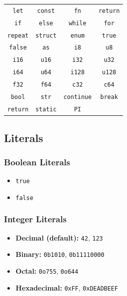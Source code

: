 \begin{table}[H]
    \centering
    \begin{tabular}{cccc}
        \toprule
        \texttt{let} & \texttt{const} & \texttt{fn} & \texttt{return} \\
        \texttt{if} & \texttt{else} & \texttt{while} & \texttt{for} \\
        \texttt{repeat} & \texttt{struct} & \texttt{enum} & \texttt{true} \\
        \texttt{false} & \texttt{as} & \texttt{i8} & \texttt{u8} \\
        \texttt{i16} & \texttt{u16} & \texttt{i32} & \texttt{u32} \\
        \texttt{i64} & \texttt{u64} & \texttt{i128} & \texttt{u128} \\
        \texttt{f32} & \texttt{f64} & \texttt{c32} & \texttt{c64} \\
        \texttt{bool} & \texttt{str} & \texttt{continue} & \texttt{break} \\
        \texttt{return} & \texttt{static} & \texttt{PI} \\
        \bottomrule
    \end{tabular}
\end{table}

\subsection{Literals}
\subsubsection{Boolean Literals}
\begin{itemize}
    \item \texttt{true}
    \item \texttt{false}
\end{itemize}

\subsubsection{Integer Literals}
\begin{itemize}
    \item \textbf{Decimal (default):} \texttt{42}, \texttt{123}
    \item \textbf{Binary:} \texttt{0b1010}, \texttt{0b11110000}
    \item \textbf{Octal:} \texttt{0o755}, \texttt{0o644}
    \item \textbf{Hexadecimal:} \texttt{0xFF}, \texttt{0xDEADBEEF}
\end{itemize}


